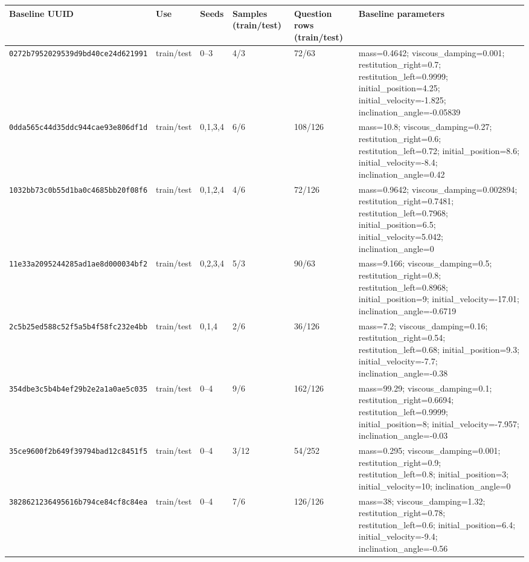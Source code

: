 \begingroup
\scriptsize
\setlength{\tabcolsep}{3pt}
\setlength{\aboverulesep}{0pt}
\setlength{\belowrulesep}{2pt}
\renewcommand{\arraystretch}{1.05}
\begin{tabular*}{\textwidth}{@{\extracolsep{\fill}}llllll@{}}
\toprule
\textbf{Baseline UUID} & \textbf{Use} & \textbf{Seeds} & \textbf{Samples (train/test)} & \textbf{Question rows (train/test)} & \textbf{Baseline parameters} \\
\midrule
\texttt{0272b7952029539d9bd40ce24d621991} & train/test & 0--3 & 4/3 & 72/63 & mass=0.4642; viscous\_damping=0.001; restitution\_right=0.7; restitution\_left=0.9999; initial\_position=4.25; initial\_velocity=-1.825; inclination\_angle=-0.05839 \\
\texttt{0dda565c44d35ddc944cae93e806df1d} & train/test & 0,1,3,4 & 6/6 & 108/126 & mass=10.8; viscous\_damping=0.27; restitution\_right=0.6; restitution\_left=0.72; initial\_position=8.6; initial\_velocity=-8.4; inclination\_angle=0.42 \\
\texttt{1032bb73c0b55d1ba0c4685bb20f08f6} & train/test & 0,1,2,4 & 4/6 & 72/126 & mass=0.9642; viscous\_damping=0.002894; restitution\_right=0.7481; restitution\_left=0.7968; initial\_position=6.5; initial\_velocity=5.042; inclination\_angle=0 \\
\texttt{11e33a2095244285ad1ae8d000034bf2} & train/test & 0,2,3,4 & 5/3 & 90/63 & mass=9.166; viscous\_damping=0.5; restitution\_right=0.8; restitution\_left=0.8968; initial\_position=9; initial\_velocity=-17.01; inclination\_angle=-0.6719 \\
\texttt{2c5b25ed588c52f5a5b4f58fc232e4bb} & train/test & 0,1,4 & 2/6 & 36/126 & mass=7.2; viscous\_damping=0.16; restitution\_right=0.54; restitution\_left=0.68; initial\_position=9.3; initial\_velocity=-7.7; inclination\_angle=-0.38 \\
\texttt{354dbe3c5b4b4ef29b2e2a1a0ae5c035} & train/test & 0--4 & 9/6 & 162/126 & mass=99.29; viscous\_damping=0.1; restitution\_right=0.6694; restitution\_left=0.9999; initial\_position=8; initial\_velocity=-7.957; inclination\_angle=-0.03 \\
\texttt{35ce9600f2b649f39794bad12c8451f5} & train/test & 0--4 & 3/12 & 54/252 & mass=0.295; viscous\_damping=0.001; restitution\_right=0.9; restitution\_left=0.8; initial\_position=3; initial\_velocity=10; inclination\_angle=0 \\
\texttt{3828621236495616b794ce84cf8c84ea} & train/test & 0--4 & 7/6 & 126/126 & mass=38; viscous\_damping=1.32; restitution\_right=0.78; restitution\_left=0.6; initial\_position=6.4; initial\_velocity=-9.4; inclination\_angle=-0.56 \\

\end{tabular*}
